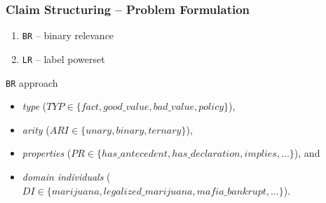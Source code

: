 \documentclass{beamer}
\begin{document}
\begin{frame}
	\frametitle{Claim Structuring -- Problem Formulation}

	\begin{enumerate}
		\item \texttt{BR} -- binary relevance
		\item \texttt{LR} -- label powerset
	\end{enumerate}

	\texttt{BR} approach
\begin{itemize}
	\item \emph{type} ($\mathit{TYP} \in \{\mathit{fact},
		\mathit{good\_value}, \mathit{bad\_value}, \mathit{policy}\}$), 
	\item \emph{arity} ($\mathit{ARI} \in \{\mathit{unary},
		\mathit{binary},  \mathit{ternary}\}$),
	\item \emph{properties} ($\mathit{PR} \in \{\mathit{has\_antecedent},
		\mathit{has\_declaration}, \mathit{implies}, \dots\}$), and
	\item \emph{domain individuals} ($\mathit{DI} \in \{\mathit{marijuana},
		\mathit{legalized\_marijuana}, \mathit{mafia\_bankrupt},
		\dots\}$).
\end{itemize}

\end{frame}
\end{document}
